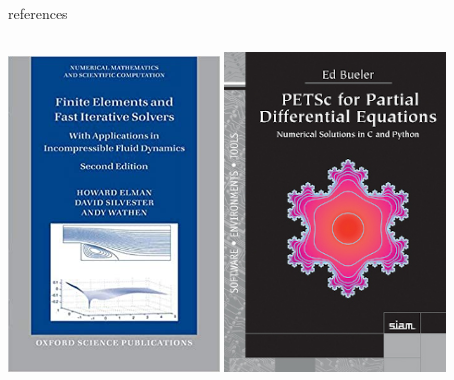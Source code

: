 \documentclass[10pt,hyperref,dvipsnames]{beamer}
\begin{document}
\begin{frame}{references}
\begin{columns}
\begin{column}{0.4\textwidth}
\bigskip
\includegraphics[width=0.42\textwidth]{figs/elmancover.jpg} \quad  \includegraphics[width=0.44\textwidth]{figs/frontcover.jpg}
\end{column}

\end{columns}
\end{frame}
\end{document}

